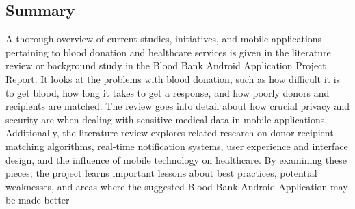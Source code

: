 \subsection{Summary}
A thorough overview of current studies, initiatives, and mobile applications pertaining to blood
donation and healthcare services is given in the literature review or background study in the
Blood Bank Android Application Project Report. It looks at the problems with blood donation,
such as how difficult it is to get blood, how long it takes to get a response, and how poorly donors
and recipients are matched. The review goes into detail about how crucial privacy and security
are when dealing with sensitive medical data in mobile applications. Additionally, the literature
review explores related research on donor-recipient matching algorithms, real-time notification
systems, user experience and interface design, and the influence of mobile technology on
healthcare. By examining these pieces, the project learns important lessons about best practices,
potential weaknesses, and areas where the suggested Blood Bank Android Application may be
made better
